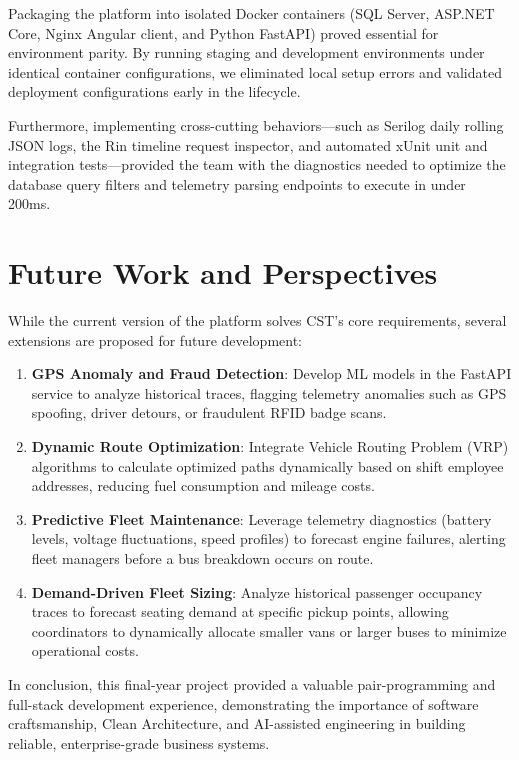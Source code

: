 Packaging the platform into isolated Docker containers (SQL Server, ASP.NET Core, Nginx Angular client, and Python FastAPI) proved essential for environment parity. By running staging and development environments under identical container configurations, we eliminated local setup errors and validated deployment configurations early in the lifecycle.

Furthermore, implementing cross-cutting behaviors—such as Serilog daily rolling JSON logs, the Rin timeline request inspector, and automated xUnit unit and integration tests—provided the team with the diagnostics needed to optimize the database query filters and telemetry parsing endpoints to execute in under 200ms.

\section*{Future Work and Perspectives}
While the current version of the platform solves CST's core requirements, several extensions are proposed for future development:
\begin{enumerate}
  \item \textbf{GPS Anomaly and Fraud Detection}: Develop ML models in the FastAPI service to analyze historical traces, flagging telemetry anomalies such as GPS spoofing, driver detours, or fraudulent RFID badge scans.
  \item \textbf{Dynamic Route Optimization}: Integrate Vehicle Routing Problem (VRP) algorithms to calculate optimized paths dynamically based on shift employee addresses, reducing fuel consumption and mileage costs.
  \item \textbf{Predictive Fleet Maintenance}: Leverage telemetry diagnostics (battery levels, voltage fluctuations, speed profiles) to forecast engine failures, alerting fleet managers before a bus breakdown occurs on route.
  \item \textbf{Demand-Driven Fleet Sizing}: Analyze historical passenger occupancy traces to forecast seating demand at specific pickup points, allowing coordinators to dynamically allocate smaller vans or larger buses to minimize operational costs.
\end{enumerate}

In conclusion, this final-year project provided a valuable pair-programming and full-stack development experience, demonstrating the importance of software craftsmanship, Clean Architecture, and AI-assisted engineering in building reliable, enterprise-grade business systems.
